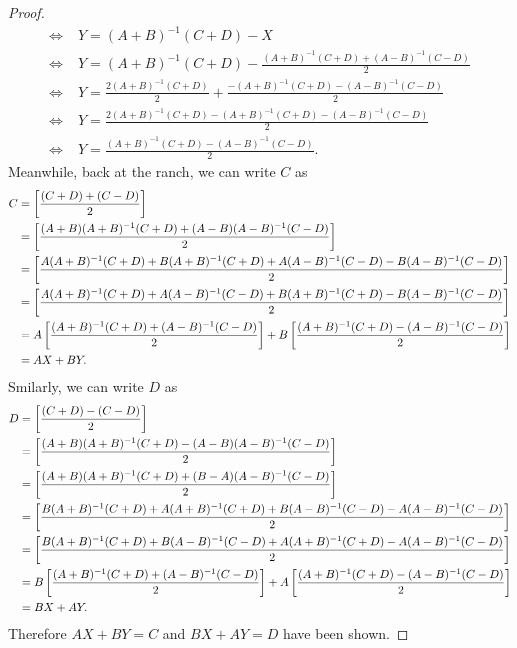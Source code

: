 \begin{proof}
\begin{align*}
        \Longleftrightarrow \;& Y = (A+B)^{-1}(C+D) - X\\
        \Longleftrightarrow \;& Y = (A+B)^{-1}(C+D) - \frac{(A+B)^{-1}(C+D) + (A-B)^{-1}(C-D)}{2}\\
        \Longleftrightarrow \;& Y = \frac{2(A+B)^{-1}(C+D)}{2} + \frac{-(A+B)^{-1}(C+D) - (A-B)^{-1}(C-D)}{2}\\
        \Longleftrightarrow \;& Y = \frac{2(A+B)^{-1}(C+D) -(A+B)^{-1}(C+D) - (A-B)^{-1}(C-D)}{2}\\
        \Longleftrightarrow \;& Y = \frac{(A+B)^{-1}(C+D) - (A-B)^{-1}(C-D)}{2}.
    \end{align*}
    Meanwhile, back at the ranch, we can write $C$ as
    \begin{align*}
        C &=\left[ {\frac{(C+D) +(C-D)}{2}} \right]\\
        &= \left[ {\frac{(A+B)(A+B)^{-1}(C+D) + (A-B)(A-B)^{-1}(C-D)}{2}} \right]\\
        &= \left[ {\frac{A(A+B)^{-1}(C+D) + B(A+B)^{-1}(C+D) + A(A-B)^{-1}(C-D) - B(A-B)^{-1}(C-D)}{2}} \right]\\
        &= \left[ {\frac{A(A+B)^{-1}(C+D) + A(A-B)^{-1}(C-D) + B(A+B)^{-1}(C+D) - B(A-B)^{-1}(C-D)}{2}} \right]\\
        &= A\left[ {\frac{(A+B)^{-1}(C+D) + (A-B)^{-1}(C-D)}{2}} \right] + B\left[ {\frac{(A+B)^{-1}(C+D) - (A-B)^{-1}(C-D)}{2}} \right]\\
        &= AX + BY.
    \end{align*}
    Smilarly, we can write $D$ as
    \begin{align*}
        D &= \left[ {\frac{(C+D) - (C-D) }{2}} \right]\\
        &= \left[ {\frac{(A+B)(A+B)^{-1}(C+D) - (A-B)(A-B)^{-1}(C-D) }{2}} \right]\\
        &= \left[ {\frac{(A+B)(A+B)^{-1}(C+D) + (B-A)(A-B)^{-1}(C-D) }{2}} \right]\\
        &= \left[ {\frac{B(A+B)^{-1}(C+D) + A (A+B)^{-1}(C+D) + B(A-B)^{-1}(C-D)  -A (A-B)^{-1}(C-D)}{2}} \right]\\
        &= \left[ {\frac{B(A+B)^{-1}(C+D) + B(A-B)^{-1}(C-D) + A (A+B)^{-1}(C+D) -A (A-B)^{-1}(C-D)}{2}} \right]\\
        &= B \left[ {\frac{(A+B)^{-1}(C+D) + (A-B)^{-1}(C-D)}{2}} \right] + A \left[ {\frac{(A+B)^{-1}(C+D) - (A-B)^{-1}(C-D)}{2}} \right]\\
        &= BX + AY.
    \end{align*}
    Therefore $AX + BY = C$ and $BX + AY = D$ have been shown.
\end{proof}